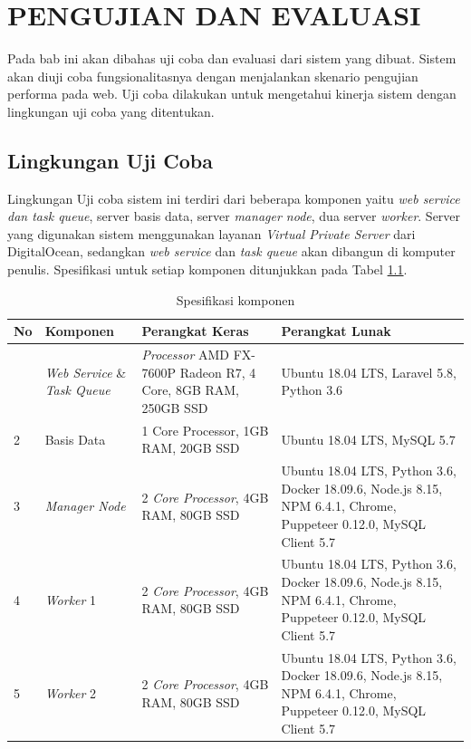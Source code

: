 \chapter{PENGUJIAN DAN EVALUASI}
	Pada bab ini akan dibahas uji coba dan evaluasi dari sistem yang dibuat. Sistem akan diuji coba fungsionalitasnya dengan menjalankan skenario pengujian performa pada web. Uji coba dilakukan untuk mengetahui kinerja sistem dengan lingkungan uji coba yang ditentukan.
	
	\section{Lingkungan Uji Coba}
		Lingkungan Uji coba sistem ini terdiri dari beberapa komponen yaitu \textit{web service dan task queue}, server basis data, server \textit{manager node}, dua server \textit{worker}. Server yang digunakan sistem menggunakan layanan \textit{Virtual Private Server} dari DigitalOcean, sedangkan \textit{web service} dan \textit{task queue} akan dibangun di komputer penulis. Spesifikasi untuk setiap komponen ditunjukkan pada Tabel \ref{tabelspesifikasi}.
		\begin{longtable}{|p{}|p{}|p{}|p{}|}
			\caption{Spesifikasi komponen} \label{tabelspesifikasi} \\
			\hline
			\textbf{No} & \textbf{Komponen} & \textbf{Perangkat Keras} & \textbf{Perangkat Lunak} \\ \hline
			\endhead
			\endfoot
			\endlastfoot
			1 & \textit{Web Service} \& \textit{Task Queue} & \textit{Processor} AMD FX-7600P Radeon R7, 4 Core, 8GB RAM, 250GB SSD & Ubuntu 18.04 LTS, Laravel 5.8, Python 3.6 \\ \hline
			2 & Basis Data & 1 Core Processor, 1GB RAM, 20GB SSD & Ubuntu 18.04 LTS, MySQL 5.7 \\ \hline
			3 & \textit{Manager Node} & 2 \textit{Core Processor}, 4GB RAM, 80GB SSD & Ubuntu 18.04 LTS, Python 3.6, Docker 18.09.6, Node.js 8.15, NPM 6.4.1, Chrome, Puppeteer 0.12.0, MySQL Client 5.7 \\ \hline
			4 & \textit{Worker} 1 & 2 \textit{Core Processor}, 4GB RAM, 80GB SSD & Ubuntu 18.04 LTS, Python 3.6, Docker 18.09.6, Node.js 8.15, NPM 6.4.1, Chrome, Puppeteer 0.12.0, MySQL Client 5.7 \\ \hline
			5 & \textit{Worker} 2 & 2 \textit{Core Processor}, 4GB RAM, 80GB SSD & Ubuntu 18.04 LTS, Python 3.6, Docker 18.09.6, Node.js 8.15, NPM 6.4.1, Chrome, Puppeteer 0.12.0, MySQL Client 5.7 \\ \hline
		\end{longtable}
	
